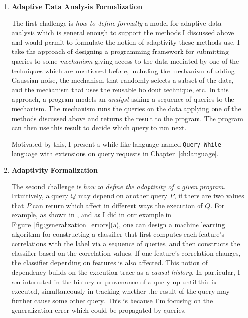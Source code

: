 \begin{enumerate}
 \item
 \textbf{Adaptive Data Analysis Formalization}

The first challenge is \emph{how to define formally} a model for adaptive data analysis which is general enough to support the methods I discussed above and would permit to formulate the notion of adaptivity these methods use. 
I take the approach of designing a programming framework for submitting queries to some \emph{mechanism} giving access 
to the data mediated by one of the techniques which are mentioned before, 
including the mechanism of adding Gaussian noise, 
the mechanism that randomly selects a subset of the data, 
and the mechanism that uses the reusable holdout technique, etc. 
In this approach, a program models an \emph{analyst} asking a sequence of queries to the mechanism. 
The mechanism runs the queries on the data applying one of the methods discussed above and returns the result to the program. The program can then use this result to decide which query to run next. 

Motivated by this, I present a while-like language 
named {\tt Query While} language with extensions on query requests in Chapter~\ref{ch:language}.

\item 
\textbf{Adaptivity Formalization}

The second challenge is \emph{how to define the adaptivity of a given program}.
Intuitively, a query $Q$ may depend on another query $P$, if there are two values that $P$ can return which affect in different ways the execution of $Q$. 
For example, as shown in \cite{dwork2015reusable}, and as I did in our example in Figure~\ref{fig:generalization_errors}(a), one can design a machine learning algorithm for constructing a classifier that first computes each feature's correlations with the label via a sequence of queries, and then constructs the classifier based on the correlation values. 
If one feature's correlation changes, the classifier depending on features is also affected. 
This notion of dependency builds on the execution trace as a \emph{causal history}. 
In particular, I am interested in the history or provenance of a query up until this is executed, 
simultaneously in tracking whether the result of the query may further cause some other query. 
This is because I'm focusing on the generalization error which could be propagated by queries.


\end{enumerate}
